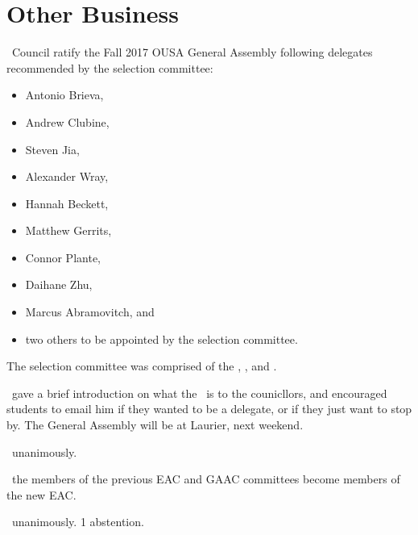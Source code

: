 \section*{Other Business}


\begin{motion}
    \birt\ Council ratify the Fall 2017 OUSA General Assembly following
    delegates recommended by the selection committee:
    \begin{itemize}
        \item Antonio Brieva,
        \item Andrew Clubine,
        \item Steven Jia,
        \item Alexander Wray,
        \item Hannah Beckett,
        \item Matthew Gerrits,
        \item Connor Plante,
        \item Daihane Zhu,
        \item Marcus Abramovitch, and
        \item two others to be appointed by the selection committee.
    \end{itemize}
    The selection committee was comprised of the \vpe, \pres, and 
    \printSpeaker.
    \movers{\andrewc}{\benjamin}

    \andrewc\ gave a brief introduction on what the \ousa\ is to the
    counicllors, and encouraged students to email him if they wanted to
    be a delegate, or if they just want to stop by. The General Assembly will
    be at Laurier, next weekend.

    \carries\ unanimously.
\end{motion}

\begin{motion}
    \birt\ the members of the previous EAC and GAAC committees become members
    of the new EAC.
    \movers{\jason}{\andrewc}

    \carries\ unanimously. 1 abstention.
\end{motion}

